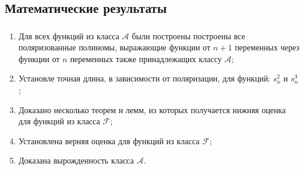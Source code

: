 \documentclass[t]{beamer}
\begin{document}
\subsection{Математические результаты}
\begin{frame}
\frametitle{\insertsection}
\framesubtitle{\insertsubsection}
\begin{enumerate}
\item Для всех функций из класса $\mathcal{A}$ были построены построены все поляризованные
полиномы, выражающие функции от $n+1$ переменных через функции от $n$ переменных также принадлежащих
классу $\mathcal{A}$;
\item<2-> Установле точная длина, в зависимости от поляризации, для функций: $s^2_n$ и $s^3_n$;
\item<3-> Доказано несколько теорем и лемм, из которых получается нижняя оценка для функций из
класса $\mathcal{F}$;
\item<4-> Установлена верняя оценка для функций из класса $\mathcal{F}$;
\item<5-> Доказана вырожденность класса $\mathcal{A}$.
\end{enumerate}
\end{frame}
\end{document}

